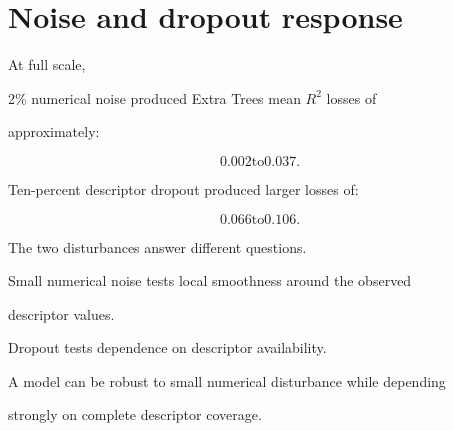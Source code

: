 \documentclass[11pt,a4paper,oneside]{report}
\begin{document}
\section{Noise and dropout response}



At full scale,

2\% numerical noise produced Extra Trees mean $R^2$ losses of

approximately:



\begin{equation}
0.002
\text{to}
0.037.
\end{equation}



Ten-percent descriptor dropout produced larger losses of:



\begin{equation}
0.066
\text{to}
0.106.
\end{equation}



The two disturbances answer different questions.



Small numerical noise tests local smoothness around the observed

descriptor values.



Dropout tests dependence on descriptor availability.



A model can be robust to small numerical disturbance while depending

strongly on complete descriptor coverage.
\end{document}
